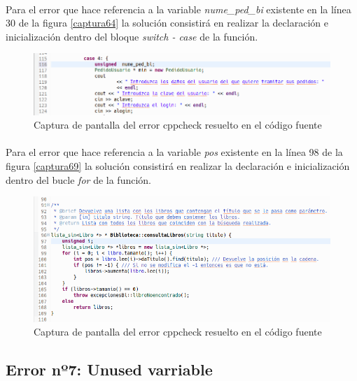 			\paragraph{}Para el error que hace referencia a la variable \textit{nume\_ped\_bi} existente en la línea 30 de la figura \ref*{captura64} la solución consistirá en realizar la declaración e inicialización dentro del bloque \textit{switch - case} de la función.
			
			\begin{figure}[H]
				\centering
				\includegraphics[scale=0.5]{img/captura80.png}
				\caption{Captura de pantalla del error cppcheck  resuelto en el código fuente}
				\label{captura80}
			\end{figure}
		
			\paragraph{}Para el error que hace referencia a la variable \textit{pos} existente en la línea 98 de la figura \ref*{captura69} la solución consistirá en realizar la declaración e inicialización dentro del bucle \textit{for} de la función.
			
			\begin{figure}[H]
				\centering
				\includegraphics[scale=0.55]{img/captura81.png}
				\caption{Captura de pantalla del error cppcheck  resuelto en el código fuente}
				\label{captura81}
			\end{figure}
		
	\subsection{Error nº7: Unused varriable}
	
